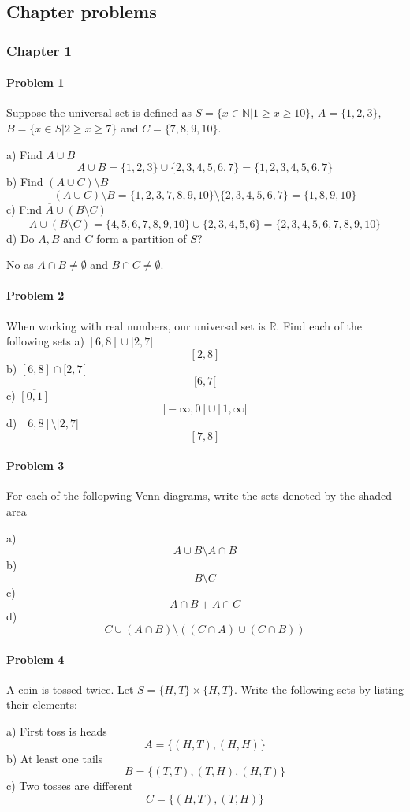 \subsection{Chapter problems}
\subsubsection{Chapter 1}
\paragraph{Problem 1}
Suppose the universal set is defined as $S=\{x\in \mathbb{N} | 1\geq x \geq 10\}$, $A=\{1,2,3\}$, $B=\{x\in S|2\geq x\geq 7\}$ and $C=\{7,8,9,10\}$.

a) Find $A\cup B$
\[
    A\cup B=\{1,2,3\}\cup\{2,3,4,5,6,7\}=\{1,2,3,4,5,6,7\}
\]
b) Find $(A\cup C)\setminus B$
\[
    (A\cup C)\setminus B=\{1,2,3,7,8,9,10\}\setminus \{2,3,4,5,6,7\}=\{1,8,9,10\}
\]
c) Find $\overline{A}\cup(B\setminus C)$
\[
    \overline{A}\cup(B\setminus C)=\{4,5,6,7,8,9,10\}\cup\{2,3,4,5,6\}=\{2,3,4,5,6,7,8,9,10\}
\]
d) Do $A,B$ and $C$ form a partition of $S$?

No as $A\cap B\neq\emptyset$ and $B\cap C\neq\emptyset$.
\paragraph{Problem 2}
When working with real numbers, our universal set is $\mathbb{R}$. Find each of the following sets
a) $[6,8]\cup[2,7[$
\[
    [2,8]
\]
b) $[6,8]\cap[2,7[$
\[
    [6,7[
\]
c) $\overline{[0,1]}$
\[
    ]-\infty,0[\cup]1,\infty[
\]
d) $[6,8]\setminus ]2,7[$
\[
    [7,8]
\]
\paragraph{Problem 3}
For each of the follopwing Venn diagrams, write the sets denoted by the shaded area

a)
\[
    A\cup B\setminus A\cap B
\]
b)
\[
    B\setminus C
\]
c)
\[
    A\cap B+A\cap C
\]
d)
\[
    C\cup(A\cap B)\setminus ((C\cap A)\cup (C\cap B))
\]
\paragraph{Problem 4}
A coin is tossed twice. Let $S=\{H,T\}\times\{H,T\}$. Write the following sets by listing their elements:

a) First toss is heads
\[
    A=\{(H,T),(H,H)\}
\]
b) At least one tails
\[
    B=\{(T,T),(T,H),(H,T)\}
\]
c) Two tosses are different
\[
    C=\{(H,T),(T,H)\}
\]
